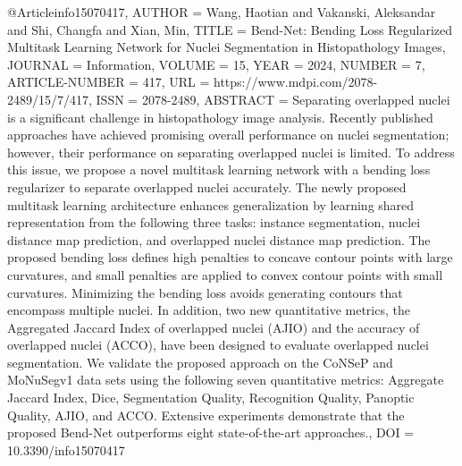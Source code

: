
@Article{info15070417,
AUTHOR = {Wang, Haotian and Vakanski, Aleksandar and Shi, Changfa and Xian, Min},
TITLE = {Bend-Net: Bending Loss Regularized Multitask Learning Network for Nuclei Segmentation in Histopathology Images},
JOURNAL = {Information},
VOLUME = {15},
YEAR = {2024},
NUMBER = {7},
ARTICLE-NUMBER = {417},
URL = {https://www.mdpi.com/2078-2489/15/7/417},
ISSN = {2078-2489},
ABSTRACT = {Separating overlapped nuclei is a significant challenge in histopathology image analysis. Recently published approaches have achieved promising overall performance on nuclei segmentation; however, their performance on separating overlapped nuclei is limited. To address this issue, we propose a novel multitask learning network with a bending loss regularizer to separate overlapped nuclei accurately. The newly proposed multitask learning architecture enhances generalization by learning shared representation from the following three tasks: instance segmentation, nuclei distance map prediction, and overlapped nuclei distance map prediction. The proposed bending loss defines high penalties to concave contour points with large curvatures, and small penalties are applied to convex contour points with small curvatures. Minimizing the bending loss avoids generating contours that encompass multiple nuclei. In addition, two new quantitative metrics, the Aggregated Jaccard Index of overlapped nuclei (AJIO) and the accuracy of overlapped nuclei (ACCO), have been designed to evaluate overlapped nuclei segmentation. We validate the proposed approach on the CoNSeP and MoNuSegv1 data sets using the following seven quantitative metrics: Aggregate Jaccard Index, Dice, Segmentation Quality, Recognition Quality, Panoptic Quality, AJIO, and ACCO. Extensive experiments demonstrate that the proposed Bend-Net outperforms eight state-of-the-art approaches.},
DOI = {10.3390/info15070417}
}